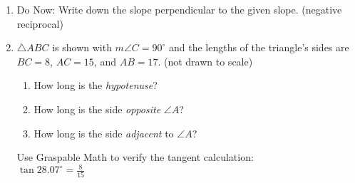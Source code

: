 \documentclass[12pt, twoside]{article}
\begin{document}
\begin{enumerate}
\newpage
\item Do Now: Write down the slope perpendicular to the given slope. (negative reciprocal) \vspace{0.5cm}
\begin{enumerate}
\end{enumerate}

\newpage
\item $\triangle ABC$ is shown with $m\angle C=90^\circ$ and the lengths of the triangle's sides are $BC=8$, $AC=15$, and $AB=17$. (not drawn to scale)
  \begin{multicols}{2}
    \begin{enumerate}
      \item How long is the \emph{hypotenuse}? \vspace{0.5cm}
      \item How long is the side \emph{opposite} $\angle A$? \vspace{0.5cm}
      \item How long is the side \emph{adjacent} to $\angle A$? \vspace{0.5cm}
    \end{enumerate}
    \end{multicols}
    Use Graspable Math to verify the tangent calculation:\\
      $\displaystyle \tan 28.07^\circ = \frac{8}{15}$


\end{enumerate}
\end{document}
